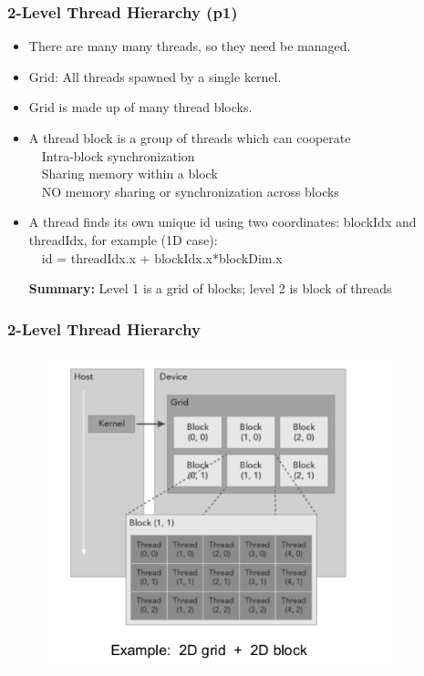 \documentclass[xcolor={x11names,svgnames,dvipsnames}]{beamer}
\begin{document}
\begin{frame}
\frametitle{2-Level Thread Hierarchy (p1)}

\begin{itemize}
\item There are many many threads, so they need be managed.
\item Grid: All threads spawned by a single kernel.
\item  Grid is made up of many thread blocks.
\item A thread block is a group of threads which can cooperate\\
\ \	Intra-block synchronization\\
\ \	Sharing memory within a block\\
\ \	NO memory sharing or synchronization across blocks
\item 
A thread finds its own unique id using two coordinates:
blockIdx and threadIdx, for example (1D case):
\\
\ \ id = threadIdx.x + blockIdx.x*blockDim.x

\textbf{Summary:} Level 1 is a grid of blocks; level 2 is block of threads

\end{itemize}

\end{frame}


\begin{frame}
\frametitle{2-Level Thread Hierarchy}
 \begin{figure}
     \includegraphics[width=0.9\textwidth, height=0.9\textheight]{kernel_2.png}
\end{figure}

\end{frame}
\end{document}

